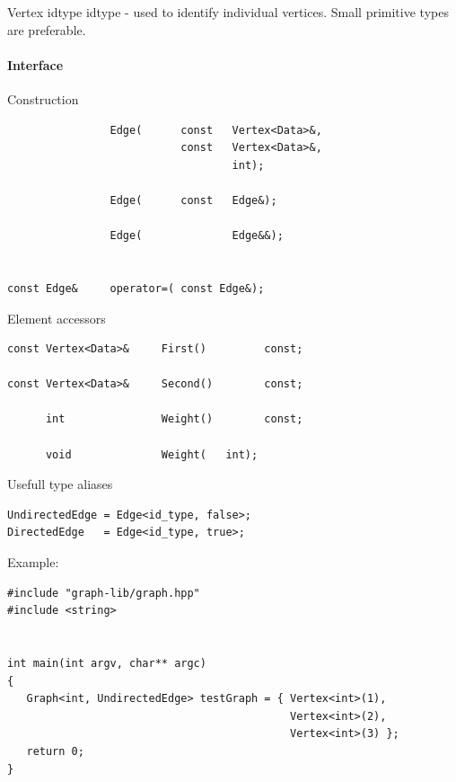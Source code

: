 \label{edge_lbl}

Vertex idtype
idtype - used to identify individual vertices. Small primitive types are preferable.

\paragraph{Interface}


Construction

\begin{lstlisting}
                Edge(      const   Vertex<Data>&, 
                           const   Vertex<Data>&, 
                                   int);
		
                Edge(      const   Edge&);

                Edge(              Edge&&);


const Edge&	    operator=( const Edge&);
\end{lstlisting}


Element accessors

\begin{lstlisting}
const Vertex<Data>&     First()         const;

const Vertex<Data>&     Second()        const;

      int               Weight()        const;

      void              Weight(   int);
\end{lstlisting}

Usefull type aliases

\begin{lstlisting}
UndirectedEdge = Edge<id_type, false>;
DirectedEdge   = Edge<id_type, true>;
\end{lstlisting}

Example:

\begin{lstlisting}
#include "graph-lib/graph.hpp"
#include <string>


int main(int argv, char** argc)
{
   Graph<int, UndirectedEdge> testGraph = { Vertex<int>(1),
                                            Vertex<int>(2),
                                            Vertex<int>(3) };
   return 0;
}

\end{lstlisting}